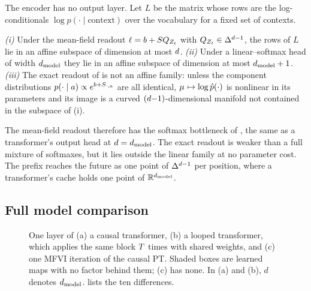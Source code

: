 The encoder has no output layer. Let $L$ be the matrix whose rows
are the log-conditionals $\log p(\cdot \mid \text{context})$ over the vocabulary for a fixed
set of contexts.

\begin{proposition}
\label{prop:readout}
\emph{(i)} Under the mean-field readout $\ell = b + SQ_{Z_{t}}$ with
$Q_{Z_{t}}\in\Delta^{d-1}$, the rows of $L$ lie in an affine subspace of dimension at most
$d$. \emph{(ii)} Under a linear--softmax head of width $d_{\text{model}}$ they lie in an affine
subspace of dimension at most $d_{\text{model}}+1$. \emph{(iii)} The exact readout of  is not an
affine family: unless the component distributions $p(\cdot\mid a)\propto e^{b + S_{\cdot,a}}$
are all identical, $\mu_{} \mapsto \log\hat p(\cdot)$ is nonlinear in its parameters and its
image is a curved $(d{-}1)$-dimensional manifold not contained in the subspace of (i).
\end{proposition}

The mean-field readout therefore has the softmax bottleneck of \citet{yang2018breaking}, the
same as a transformer's output head at $d = d_{\text{model}}$. The exact readout is weaker than a full
mixture of softmaxes, but it lies outside the linear family at no parameter cost. The prefix
reaches the future as one point of $\Delta^{d-1}$ per position, where a transformer's cache
holds one point of $\mathbb{R}^{d_{\text{model}}}$.

\subsection{Full model comparison}
\label{sec:full-comparison}

\begin{figure}[t]
\begin{minipage}[c]{0.7\textwidth}
\resizebox{\linewidth}{!}{}
\end{minipage}\hfill
\begin{minipage}[c]{0.27\textwidth}
\caption{One layer of (a) a causal transformer, (b) a looped transformer, which applies the
same block $T$ times with shared weights, and (c) one MFVI iteration of the causal PT.
Shaded boxes are learned maps with no factor behind them; (c) has none. In (a) and (b), $d$
denotes $d_{\text{model}}$.  lists the ten differences.}
\label{fig:computation-graphs}
\end{minipage}
\end{figure}

